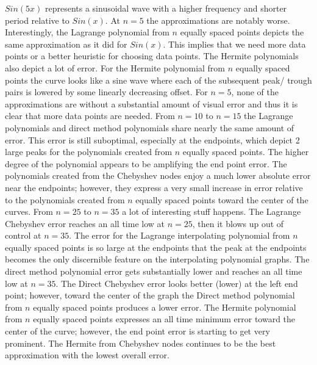\documentclass[11pt]{article}%
\begin{document}
$Sin(5x)$ represents a sinusoidal wave with a higher frequency and shorter period relative to $Sin(x)$. At $n = 5$ the approximations are notably worse. Interestingly, the Lagrange polynomial from $n$ equally spaced points depicts the same approximation as it did for $Sin(x)$. This implies that we need more data points or a better heuristic for choosing data points. The Hermite polynomials also depict a lot of error. For the Hermite polynomial from $n$ equally spaced points the curve looks like a sine wave where each of the subsequent peak/ trough pairs is lowered by some linearly decreasing offset. For $n = 5$, none of the approximations are without a substantial amount of visual error and thus it is clear that more data points are needed. From $n= 10$ to $n = 15$ the Lagrange polynomials and direct method polynomials share nearly the same amount of error. This error is still suboptimal, especially at the endpoints, which depict 2 large peaks for the polynomials created from $n$ equally spaced points. The higher degree of the polynomial appears to be amplifying the end point error. The polynomials created from the Chebyshev nodes enjoy a much lower absolute error near the endpoints; however, they express a very small increase in error relative to the polynomials created from $n$ equally spaced points toward the center of the curves. From $n = 25$ to $n = 35$ a lot of interesting stuff happens. The Lagrange Chebyshev error reaches an all time low at $n = 25$, then it blows up out of control at $n = 35$. The error for the Lagrange interpolating polynomial from $n$ equally spaced points is so large at the endpoints that the peak at the endpoints becomes the only discernible feature on the interpolating polynomial graphs. The direct method polynomial error gets substantially lower and reaches an all time low at $n=35$. The Direct Chebyshev error looks better (lower) at the left end point; however, toward the center of the graph the Direct method polynomial from $n$ equally spaced points produces a lower error. The Hermite polynomial from $n$ equally spaced points expresses an all time minimum error toward the center of the curve; however, the end point error is starting to get very prominent. The Hermite from Chebyshev nodes continues to be the best approximation with the lowest overall error.
\end{document}
